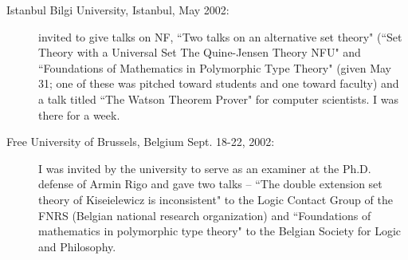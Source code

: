 \begin{description}
\begin{description}
\item[Istanbul Bilgi University, Istanbul, May 2002:]  invited to give talks on NF, ``Two talks on an alternative set theory"
(``Set Theory with a Universal Set
The Quine-Jensen Theory NFU" and ``Foundations of Mathematics in Polymorphic Type Theory"  (given May 31; one of these was pitched toward students and one toward faculty) and a talk titled ``The Watson Theorem Prover" for computer scientists.  I was there for a week.

\item[Free University of Brussels, Belgium Sept. 18-22, 2002:]  I was invited by the university to serve as an examiner at the Ph.D. defense of Armin Rigo and gave two talks -- ``The double extension set theory of Kiseielewicz is inconsistent" to the Logic Contact Group of the FNRS (Belgian national research organization) and ``Foundations of mathematics in polymorphic type theory" to the Belgian Society for Logic and Philosophy.







\end{description}



\newpage


\end{description}
